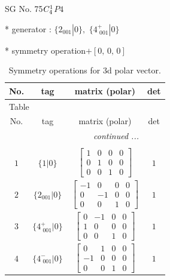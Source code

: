 \documentclass[fleqn,8pt]{jsarticle}
\begin{document}
\setcounter{MaxMatrixCols}{32}

\renewcommand{\tablename}{Table~}
\renewcommand{\figurename}{Figure~}
\begin{center}
\LARGE
SG No. 75\quad$C_{\rm 4}^{1}$\quad$P4$\quad[ tetragonal ]
\end{center}

* generator : $\{2{}_{001}|0\},\,\,\{4^{+}_{\,\,001}|0\}$

* symmetry operation\quad$+\left[ 0,\, 0,\, 0 \right]$
\renewcommand{\arraystretch}{1.3}
\begin{longtable}{cccc}
\caption{Symmetry operations for 3d polar vector.}
 \\
 \hline \hline
No. & tag & matrix (polar) & det \\ \hline \endfirsthead

\multicolumn{3}{l}{\tablename\ \thetable{}} \\
 \hline \hline
No. & tag & matrix (polar) & det \\ \hline \endhead

 \hline \hline
\multicolumn{3}{r}{\footnotesize\it continued ...} \\ \endfoot

 \hline \hline
\multicolumn{3}{r}{} \\ \endlastfoot

$ 1 $ & $ \{1|0\} $ & $ \begin{bmatrix} 1 & 0 & 0 & 0 \\ 0 & 1 & 0 & 0 \\ 0 & 0 & 1 & 0 \end{bmatrix} $ & $ 1 $ \\ \hline
$ 2 $ & $ \{2{}_{001}|0\} $ & $ \begin{bmatrix} -1 & 0 & 0 & 0 \\ 0 & -1 & 0 & 0 \\ 0 & 0 & 1 & 0 \end{bmatrix} $ & $ 1 $ \\ \hline
$ 3 $ & $ \{4^{+}_{\,\,001}|0\} $ & $ \begin{bmatrix} 0 & -1 & 0 & 0 \\ 1 & 0 & 0 & 0 \\ 0 & 0 & 1 & 0 \end{bmatrix} $ & $ 1 $ \\ \hline
$ 4 $ & $ \{4^{-}_{\,\,001}|0\} $ & $ \begin{bmatrix} 0 & 1 & 0 & 0 \\ -1 & 0 & 0 & 0 \\ 0 & 0 & 1 & 0 \end{bmatrix} $ & $ 1 $ \\
\end{longtable}
\end{document}
